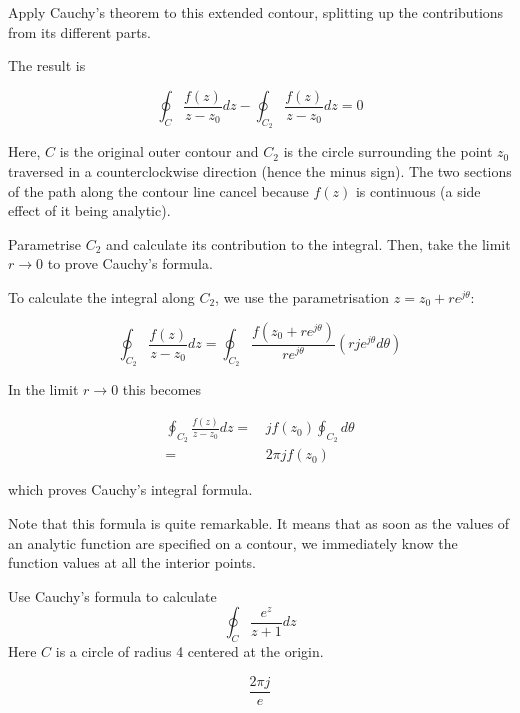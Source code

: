 \begin{cue}
Apply Cauchy's theorem to this extended contour, splitting up the contributions from its different parts.
\end{cue}

The result is

\begin{equation}
\oint_{{C}} \frac{f(z)} {z-z_0} dz -\oint_{{C}_2} \frac{f(z)}
{z-z_0} dz=0
\end{equation} 

Here, ${C}$ is the original outer contour and ${C}_2$ is the circle surrounding the point $z_0$ traversed in a counterclockwise direction (hence the minus sign). The two sections of the path along the contour line cancel because $f(z)$ is continuous (a side effect of it being analytic).

\begin{cue}
Parametrise ${C}_2$ and calculate its contribution to the integral. Then, take the limit $ r \to 0 $ to prove Cauchy's formula.   
\end{cue}

To calculate the integral along ${C}_2$, we use the parametrisation $z=z_0 + r e^{j\theta}$:

\begin{equation}
\oint_{{C}_2} \frac{f(z)} {z-z_0} dz = \oint_{{C}_2} \frac{f(z_0
+ r e^{j\theta})} {r e^{j\theta}} \left(rje^{j \theta} d \theta\right)
\end{equation}

In the limit $ r \to 0 $ this becomes

\begin{align}
\oint_{{C}_2} \frac{f(z)} {z-z_0} dz = & \, j f(z_0) \oint_{{C}_2} d \theta \nonumber \\
 = & \, 2 \pi j f(z_0)
\end{align}
 
which proves Cauchy's integral formula.

Note that this formula is quite remarkable. It means that as soon as the values of an analytic function are specified on a contour, we immediately know the function values at all the interior points.

\begin{exer}
Use Cauchy's formula to calculate 
$$\oint_{{C}}  \frac {e^z} {z+1} dz$$
Here ${C}$ is a circle of radius 4 centered at the origin.
\begin{sol}
$$\frac{2 \pi j}{e}$$
\end{sol}
\end{exer}


